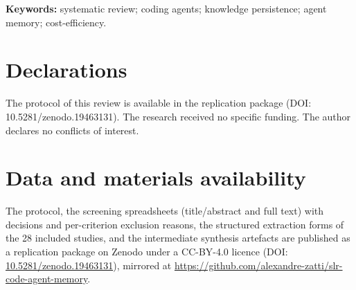 \documentclass[12pt,a4paper]{article}
\begin{document}
\begin{abstract}
Some gains combine persistence with changes in scaffold, tooling, or
search budget rather than isolating the memory component.
Cost reporting remains uneven:
eight of the 24 architecture studies (33\%) omit usable cost data,
and only a subset of the reporting studies isolates memory's
incremental operating cost.
Nine included studies (32\%) report adverse or cautionary findings
related to persistence (retrieval noise, model-dependent overhead,
security, or evaluation artefacts), and no study compares three or more
independent persistence architectures under the same benchmark, model
backbone, scaffold, compute budget, and cost-accounting protocol.
\textbf{Conclusion.}
The absence of head-to-head comparisons and the underreporting of
costs limit both architectural choice and practical assessment.
The next experiment should compare three or more independent
persistence architectures under the same benchmark, model backbone,
scaffold, compute budget, and cost-accounting protocol.
\end{abstract}

\textbf{Keywords:} systematic review; coding agents; knowledge
persistence; agent memory; cost-efficiency.












\section*{Declarations}
The protocol of this review is available in the replication package
(DOI: 10.5281/zenodo.19463131).
The research received no specific funding.
The author declares no conflicts of interest.

\section*{Data and materials availability}
The protocol, the screening spreadsheets (title/abstract and full text)
with decisions and per-criterion exclusion reasons, the structured
extraction forms of the 28 included studies, and the intermediate
synthesis artefacts are published as a replication package on Zenodo
under a CC-BY-4.0 licence (DOI:
\href{https://doi.org/10.5281/zenodo.19463131}{10.5281/zenodo.19463131}),
mirrored at
\url{https://github.com/alexandre-zatti/slr-code-agent-memory}.



\end{document}
